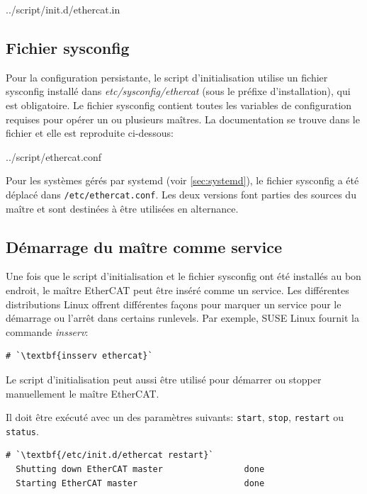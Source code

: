 \documentclass[a4paper,12pt,BCOR=6mm,bibtotoc,idxtotoc]{scrbook}
\begin{document}

    {../script/init.d/ethercat.in}

\subsection{Fichier sysconfig}
\label{sec:sysconfig}

Pour la configuration persistante, le script d'initialisation utilise
un fichier sysconfig install\'e dans \textit{etc/sysconfig/ethercat}
(sous le pr\'efixe d'installation), qui est obligatoire.  Le fichier
sysconfig contient toutes les variables de configuration requises pour
op\'erer un ou plusieurs ma\^itres. La documentation se trouve dans le
fichier et elle est reproduite ci-dessous:


    {../script/ethercat.conf}

    Pour les syst\`emes g\'er\'es par systemd (voir \autoref{sec:systemd}),
    le fichier sysconfig a \'et\'e d\'eplac\'e dans \lstinline+/etc/ethercat.conf+.
    Les deux versions font parties des sources du ma\^itre et sont destin\'ees
    \`a \^etre utilis\'ees en alternance.

\subsection{D\'emarrage du ma\^itre comme service}
\label{sec:service}

Une fois que le script d'initialisation et le fichier sysconfig ont
\'et\'e install\'es au bon endroit, le ma\^itre EtherCAT peut \^etre
ins\'er\'e comme un service.  Les diff\'erentes distributions Linux
offrent diff\'erentes fa\c{c}ons pour marquer un service pour le
d\'emarrage ou l'arr\^et dans certains runlevels. Par exemple, SUSE
Linux fournit la commande \textit{insserv}:

\begin{lstlisting}
# `\textbf{insserv ethercat}`
\end{lstlisting}

Le script d'initialisation peut aussi \^etre utilis\'e pour d\'emarrer
ou stopper manuellement le ma\^itre EtherCAT.

Il doit \^etre ex\'ecut\'e avec un des param\`etres suivants:
\texttt{start}, \texttt{stop}, \texttt{restart} ou \texttt{status}.

\begin{lstlisting}[gobble=2]
  # `\textbf{/etc/init.d/ethercat restart}`
  Shutting down EtherCAT master                done
  Starting EtherCAT master                     done
\end{lstlisting}
\end{document}
